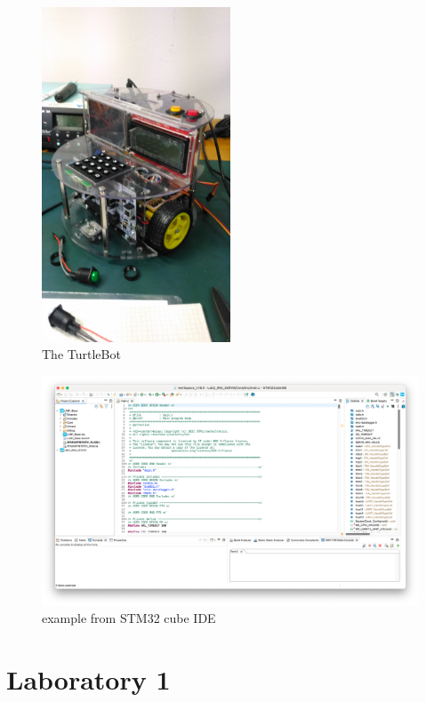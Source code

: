 \documentclass[english]{article}
\begin{document}
	\begin{figure}[H]
		\centering
		\includegraphics[width=0.5\textwidth]{figures/turtlebot_1.jpg}
		\caption{The TurtleBot}
		\label{fig:turtlebot}
	\end{figure}

	\begin{figure}[H]
		\centering
		\includegraphics[width=1\textwidth]{figures/cube_ide.png}
		\caption{example from STM32 cube IDE}
		\label{fig:cube}
	\end{figure}
\section{Laboratory 1} %
\end{document}
